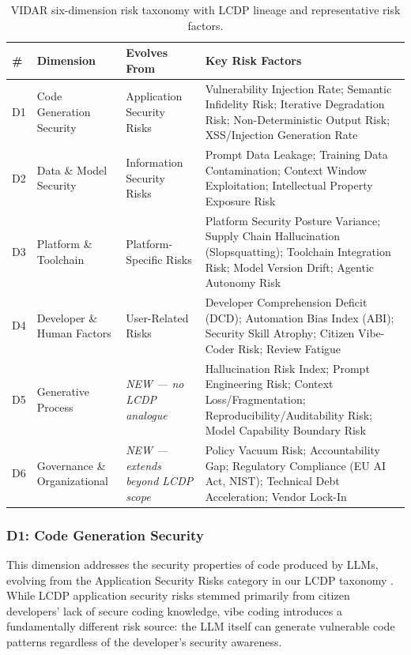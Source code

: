 \documentclass[preprint,review,12pt]{elsarticle}
\begin{document}
\begin{table}[t]
\centering
\caption{VIDAR six-dimension risk taxonomy with LCDP lineage and representative risk factors.}
\label{tab:dimensions}
\footnotesize
\begin{tabular}{p{0.3cm} p{2.5cm} p{2.5cm} p{5.5cm}}
\toprule
\textbf{\#} & \textbf{Dimension} & \textbf{Evolves From} & \textbf{Key Risk Factors} \\
\midrule
D1 & Code Generation Security & Application Security Risks & Vulnerability Injection Rate; Semantic Infidelity Risk; Iterative Degradation Risk; Non-Deterministic Output Risk; XSS/Injection Generation Rate \\
\addlinespace
D2 & Data \& Model Security & Information Security Risks & Prompt Data Leakage; Training Data Contamination; Context Window Exploitation; Intellectual Property Exposure Risk \\
\addlinespace
D3 & Platform \& Toolchain & Platform-Specific Risks & Platform Security Posture Variance; Supply Chain Hallucination (Slopsquatting); Toolchain Integration Risk; Model Version Drift; Agentic Autonomy Risk \\
\addlinespace
D4 & Developer \& Human Factors & User-Related Risks & Developer Comprehension Deficit (DCD); Automation Bias Index (ABI); Security Skill Atrophy; Citizen Vibe-Coder Risk; Review Fatigue \\
\addlinespace
D5 & Generative Process & \textit{NEW --- no LCDP analogue} & Hallucination Risk Index; Prompt Engineering Risk; Context Loss/Fragmentation; Reproducibility/Auditability Risk; Model Capability Boundary Risk \\
\addlinespace
D6 & Governance \& Organizational & \textit{NEW --- extends beyond LCDP scope} & Policy Vacuum Risk; Accountability Gap; Regulatory Compliance (EU AI Act, NIST); Technical Debt Acceleration; Vendor Lock-In \\
\bottomrule
\end{tabular}
\end{table}


\subsubsection{D1: Code Generation Security}
\label{subsubsec:d1}

This dimension addresses the security properties of code produced by LLMs, evolving from the Application Security Risks category in our LCDP taxonomy \cite{hathnagoda2024assessing}. While LCDP application security risks stemmed primarily from citizen developers' lack of secure coding knowledge, vibe coding introduces a fundamentally different risk source: the LLM itself can generate vulnerable code patterns regardless of the developer's security awareness.
\end{document}

